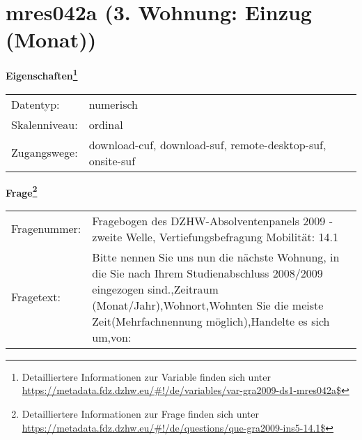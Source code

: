 
    \setcounter{footnote}{0}

    \vspace*{-1.8cm}
	\section{mres042a (3. Wohnung: Einzug (Monat))}
	\label{section:mres042a}



    \vspace*{0.5cm}
    \noindent\textbf{Eigenschaften\footnote{Detailliertere Informationen zur Variable finden sich unter
		\url{https://metadata.fdz.dzhw.eu/\#!/de/variables/var-gra2009-ds1-mres042a$}}}\\
	\begin{tabularx}{\hsize}{@{}lX}
	Datentyp: & numerisch \\
	Skalenniveau: & ordinal \\
	Zugangswege: &
	  download-cuf, 
	  download-suf, 
	  remote-desktop-suf, 
	  onsite-suf
 \\
    \end{tabularx}



				\vspace*{0.5cm}
                \noindent\textbf{Frage\footnote{Detailliertere Informationen zur Frage finden sich unter
		              \url{https://metadata.fdz.dzhw.eu/\#!/de/questions/que-gra2009-ins5-14.1$}}}\\
				\begin{tabularx}{\hsize}{@{}lX}
					Fragenummer: &
					  Fragebogen des DZHW-Absolventenpanels 2009 - zweite Welle, Vertiefungsbefragung Mobilität:
					  14.1
 \\
					Fragetext: & Bitte nennen Sie uns nun die nächste Wohnung, in die Sie nach Ihrem Studienabschluss 2008/2009 eingezogen sind.,Zeitraum (Monat/Jahr),Wohnort,Wohnten Sie die meiste Zeit(Mehrfachnennung möglich),Handelte es sich um,von: \\
				\end{tabularx}






